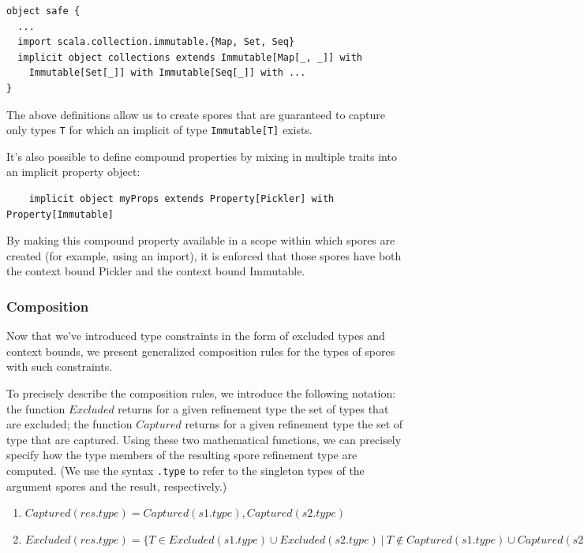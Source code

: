 \documentclass{llncs}
\begin{document}
\begin{lstlisting}
object safe {
  ...
  import scala.collection.immutable.{Map, Set, Seq}
  implicit object collections extends Immutable[Map[_, _]] with
    Immutable[Set[_]] with Immutable[Seq[_]] with ...
}
\end{lstlisting}
\noindent
The above definitions allow us to create spores that are guaranteed to capture only types \verb|T| for which an implicit of type \verb|Immutable[T]| exists.

It's also possible to define compound properties by mixing in multiple traits into an implicit property object:

\begin{verbatim}
    implicit object myProps extends Property[Pickler] with Property[Immutable]
\end{verbatim}

By making this compound property available in a scope within which spores are created (for example, using an import), it is enforced that those spores have both the context bound Pickler and the context bound Immutable.


\subsubsection{Composition}

Now that we've introduced type constraints in the form of excluded types and context bounds, we present generalized composition rules for the types of spores with such constraints.

To precisely describe the composition rules, we introduce the following notation: the function $Excluded$ returns for a given refinement type the set of types that are excluded; the function $Captured$ returns for a given refinement type the set of type that are captured. Using these two mathematical functions, we can precisely specify how the type members of the resulting spore refinement type are computed. (We use the syntax \verb|.type| to refer to the singleton types of the argument spores and the result, respectively.)

\vspace{-5mm}
\begin{enumerate}

\item $Captured(res.type) = Captured(s1.type), Captured(s2.type)$

\item $Excluded(res.type) = \{ T \in Excluded(s1.type) \cup Excluded(s2.type) ~|~ T \notin Captured(s1.type) \cup Captured(s2.type) \}$

\end{enumerate}
\end{document}
